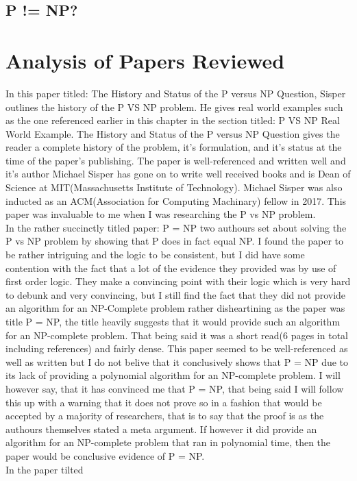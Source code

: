 \documentclass{report}
\begin{document}
\subsection{P != NP?}
\section{Analysis of Papers Reviewed}
In this paper titled: The History and Status of the P versus NP Question\cite{HistoryOfPVsNP}, Sisper outlines the history of the P VS NP problem.  He gives real world examples such as the one referenced earlier in this chapter in the section titled: P VS NP Real World Example.  The History and Status of the P versus NP Question gives the reader a complete history of the problem, it's formulation, and it's status at the time of the paper's publishing.  The paper is well-referenced and written well and it's author Michael Sisper has gone on to write well received books\cite{Sisperbib} and is Dean of Science at MIT(Massachusetts Institute of Technology)\cite{Sisperdean}.  Michael Sisper was also inducted as an ACM(Association for Computing Machinary) fellow in 2017\cite{Sisperacm}. This paper was invaluable to me when I was researching the P vs NP problem.
\\
In the rather succinctly titled paper: P = NP\cite{PVsNPSolved} two authours set about solving the P vs NP problem by showing that P does in fact equal NP.  I found the paper to be rather intriguing and the logic to be consistent, but I did have some contention with the fact that a lot of the evidence they provided was by use of first order logic.  They make a convincing point with their logic which is very hard to debunk and very convincing, but I still find the fact that they did not provide an algorithm for an NP-Complete problem rather disheartining as the paper was title P = NP, the title heavily suggests that it would provide such an algorithm for an NP-complete problem.  That being said it was a short read(6 pages in total including references) and fairly dense.  This paper seemed to be well-referenced as well as written but I do not belive that it conclusively shows that P = NP due to its lack of providing a polynomial algorithm for an NP-complete problem.  I will however say, that it has convinced me that P = NP, that being said I will follow this up with a warning that it does not prove so in a fashion that would be accepted by a majority of researchers, that is to say that the proof is as the authours themselves stated a meta argument.  If however it did provide an algorithm for an NP-complete problem that ran in polynomial time, then the paper would be conclusive evidence of P = NP.
\\
In the paper tilted
\end{document}
